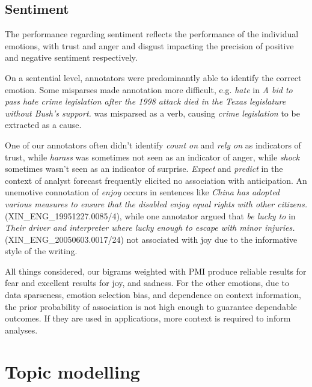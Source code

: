 \subsection{Sentiment}

The performance regarding sentiment reflects the performance of the individual emotions, with trust and anger and disgust impacting the precision of positive and negative sentiment respectively.

On a sentential level, annotators were predominantly able to identify the correct emotion. Some misparses made annotation more difficult, e.g. \textit{hate} in \textit{A bid to pass hate crime legislation after the 1998 attack died in the Texas legislature without Bush's support.} was misparsed as a verb, causing \textit{crime legislation} to be extracted as a cause.

One of our annotators often didn't identify \textit{count on} and \textit{rely on} as indicators of trust, while \textit{harass} was sometimes not seen as an indicator of anger, while \textit{shock} sometimes wasn't seen as an indicator of surprise. \textit{Expect} and \textit{predict} in the context of analyst forecast frequently elicited no association with anticipation. An unemotive connotation of \textit{enjoy} occurs in sentences like \textit{China has adopted various measures to ensure that the disabled enjoy equal rights with other citizens.} (XIN\_ENG\_19951227.0085/4), while one annotator argued that \textit{be lucky to} in \textit{Their driver and interpreter where lucky enough to escape with minor injuries.} (XIN\_ENG\_20050603.0017/24) not associated with joy due to the informative style of the writing.

All things considered, our bigrams weighted with PMI produce reliable results for fear and excellent results for joy, and sadness. For the other emotions, due to data sparseness, emotion selection bias, and dependence on context information, the prior probability of association is not high enough to guarantee dependable outcomes. If they are used in applications, more context is required to inform analyses.

\section{Topic modelling}

